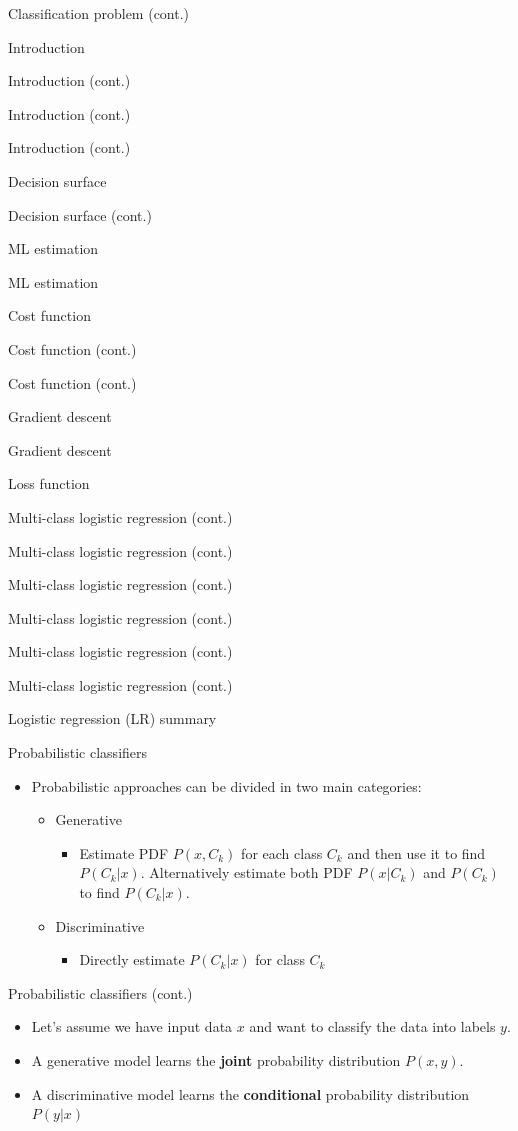 \documentclass[serif, aspectratio=169]{beamer}
\begin{document}
\begin{frame}{Classification problem (cont.)}
\begin{itemize}
\begin{frame}{Introduction}
\begin{itemize}
\begin{frame}{Introduction (cont.)}
\begin{frame}{Introduction (cont.)}
\begin{frame}{Introduction (cont.)}
\begin{frame}{Decision surface}
\begin{itemize}
\begin{frame}{Decision surface (cont.)}
\begin{frame}{ML estimation}
\begin{frame}{ML estimation}
\begin{itemize}
\begin{frame}{Cost function}
\begin{frame}{Cost function (cont.)}
\begin{itemize}
\begin{itemize}
\begin{frame}{Cost function (cont.)}
\begin{frame}{Gradient descent}
\begin{frame}{Gradient descent}
\begin{frame}{Loss function}
\begin{frame}{Multi-class logistic regression (cont.)}
\begin{frame}{Multi-class logistic regression (cont.)}
\begin{frame}{Multi-class logistic regression (cont.)}
\begin{frame}{Multi-class logistic regression (cont.)}
\begin{frame}{Multi-class logistic regression (cont.)}
\begin{frame}{Multi-class logistic regression (cont.)}
\begin{frame}{Logistic regression (LR) summary}
\begin{itemize}
\begin{frame}{Probabilistic classifiers}
    \begin{itemize}
        \item Probabilistic approaches can be divided in two main categories:
            \begin{itemize}
                \item Generative
                    \begin{itemize}
                        \item Estimate PDF $P(x, C_k)$ for each class $C_k$ and then use it to find $P(C_k|x)$. Alternatively estimate both PDF $P(x|C_k)$ and $P(C_k)$ to find $P(C_k|x)$.
                    \end{itemize}
                \item Discriminative
                    \begin{itemize}
                        \item Directly estimate $P(C_k|x)$ for class $C_k$
                    \end{itemize}
            \end{itemize}
    \end{itemize}
\end{frame}
\begin{frame}{Probabilistic classifiers (cont.)}
    \begin{itemize}
        \item Let's assume we have input data $x$ and want to classify the data into labels $y$.
        \item A generative model learns the \textbf{joint} probability distribution $P(x,y)$.
            
        \item A discriminative model learns the \textbf{conditional} probability distribution $P(y|x)$
           

\end{itemize}
\end{frame}
\end{itemize}
\end{frame}
\end{frame}
\end{frame}
\end{frame}
\end{frame}
\end{frame}
\end{frame}
\end{frame}
\end{frame}
\end{frame}
\end{frame}
\end{itemize}
\end{itemize}
\end{frame}
\end{frame}
\end{itemize}
\end{frame}
\end{frame}
\end{frame}
\end{itemize}
\end{frame}
\end{frame}
\end{frame}
\end{frame}
\end{itemize}
\end{frame}
\end{itemize}
\end{frame}
\end{document}
